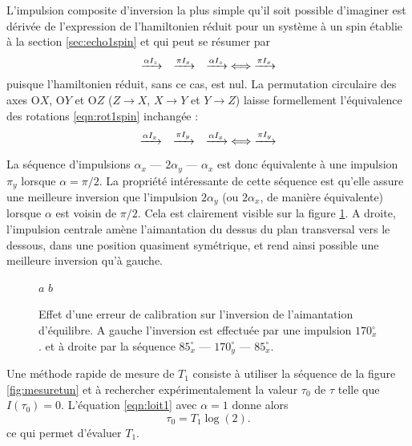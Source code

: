 L'impulsion composite d'inversion la plus simple qu'il soit possible d'imaginer
est dérivée de l'expression de l'hamiltonien réduit pour un système à un spin
établie à la section \ref{sec:echo1spin} et qui peut se résumer par
\begin{equation}
\label{eqn:rot1spin}
\xrightarrow{\alpha I_z}\quad\xrightarrow{\pi I_x}\quad\xrightarrow{\alpha I_z}
\iff
\xrightarrow{\pi I_x}
\end{equation}
puisque l'hamiltonien réduit, sans ce cas, est nul.
La permutation circulaire des axes O$X$, O$Y$ et O$Z$
($Z \rightarrow X$, $X \rightarrow Y$ et $Y \rightarrow Z$) laisse 
formellement l'équivalence des rotations \ref{eqn:rot1spin} inchangée :
\begin{equation}
\label{eqn:incompv}
\xrightarrow{\alpha I_x}\quad\xrightarrow{\pi I_y}\quad\xrightarrow{\alpha I_x}
\iff
\xrightarrow{\pi I_y}
\end{equation}

La séquence d'impulsions $\alpha_x$ --- $2\alpha_y$ --- $\alpha_x$ est donc
équivalente à une impulsion $\pi_y$ lorsque $\alpha = \pi/2$.
La propriété intéressante de cette séquence est qu'elle assure une
meilleure inversion que l'impulsion $2\alpha_y$ (ou $2\alpha_x$, de manière équivalente)
lorsque $\alpha$ est voisin de $\pi/2$.
Cela est clairement visible sur la figure \ref{fig:invcomp}.
A droite, l'impulsion centrale amène l'aimantation
du dessus du plan transversal vers le dessous, dans une position
quasiment symétrique, et rend ainsi possible une meilleure inversion qu'à gauche.

\begin{figure}[hbt]
\begin{center}
$a$
\hspace{1em}
$b$
\end{center}
\caption[Inversion composite]{Effet d'une erreur de calibration
sur l'inversion de l'aimantation d'équilibre.
A gauche l'inversion est effectuée par une impulsion $170^{\circ}_x$.
et à droite par la séquence $85^{\circ}_x$ --- $170^{\circ}_y$ --- $85^{\circ}_x$.}
\label{fig:invcomp}
\end{figure}

Une méthode rapide de mesure de $T_1$ consiste à utiliser la séquence de la figure
\ref{fig:mesuretun} et à rechercher expérimentalement la valeur $\tau_0$ de $\tau$
telle que $I(\tau_0) = 0$.
L'équation \ref{eqn:loit1} avec $\alpha = 1$ donne alors
\begin{equation}
\tau_0 = T_1 \log(2).
\end{equation}
ce qui permet d'évaluer $T_1$.

